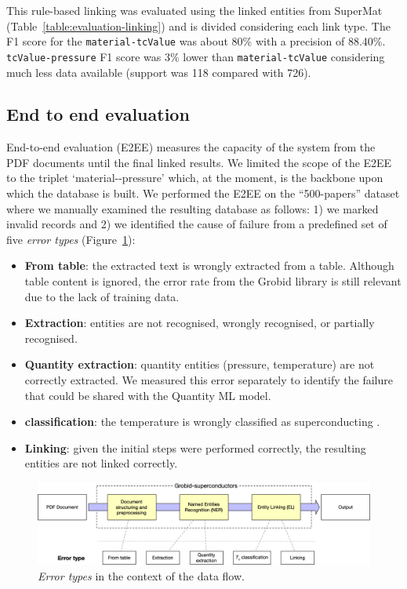 This rule-based linking was evaluated using the linked entities from SuperMat~\cite{foppiano2021supermat} (Table~\ref{table:evaluation-linking}) and is divided considering each link type.
The F1 score for the \texttt{material-tcValue} was about 80\% with a precision of 88.40\%. 
\texttt{tcValue-pressure} F1 score was 3\% lower than  \texttt{material-tcValue} considering much less data available (support was 118 compared with 726).

\subsection{End to end evaluation}

End-to-end evaluation (E2EE) measures the capacity of the system from the PDF documents until the final linked results.
We limited the scope of the E2EE to the triplet `material-\tc-pressure' which, at the moment, is the backbone upon which the database is built.
We performed the E2EE on the ``500-papers'' dataset where we manually examined the resulting database as follows: 1) we marked invalid records and 2) we identified the cause of failure from a predefined set of five \textit{error types} (Figure~\ref{fig:error-types}):
\begin{itemize}
    \item \textbf{From table}: the extracted text is wrongly extracted from a table. Although table content is ignored, the error rate from the Grobid library is still relevant due to the lack of training data.
    \item \textbf{Extraction}: entities are not recognised, wrongly recognised, or partially recognised.
    \item \textbf{Quantity extraction}: quantity entities (pressure, temperature) are not correctly extracted. We measured this error separately to identify the failure that could be shared with the Quantity ML model.
    \item \textbf{\tc classification}: the temperature is wrongly classified as superconducting \tc.
    \item \textbf{Linking}: given the initial steps were performed correctly, the resulting entities are not linked correctly.
\end{itemize}

\begin{figure}[ht]
    \centering
    \includegraphics[width=\textwidth]{figures/automatic_extraction_supercon/error-types-colors}
    \caption{\textit{Error types} in the context of the data flow. }
    \label{fig:error-types}
\end{figure}

